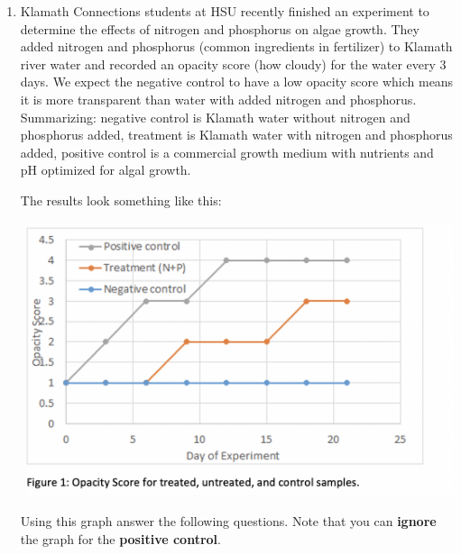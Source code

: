 \documentclass[12pt]{amsart}
\begin{document}
\begin{enumerate}
\item Klamath Connections students at HSU recently finished an experiment to determine the effects of nitrogen and phosphorus on algae growth.  They added nitrogen and phosphorus (common ingredients in fertilizer) to Klamath river water and recorded an opacity score (how cloudy) for the water every 3 days. We expect the negative control to have a low opacity score which means it is more transparent than water with added nitrogen and phosphorus.  Summarizing: negative control is Klamath water without nitrogen and phosphorus added, treatment is Klamath water with nitrogen and phosphorus added, positive control is a commercial growth medium with nutrients and pH optimized for algal growth. 

The results look something like this:

\includegraphics[scale=0.5]{KC_opacity_graph}

Using this graph answer the following questions. Note that you can {\bf ignore} the graph for the {\bf positive control}. 


\end{enumerate}
\end{document}
